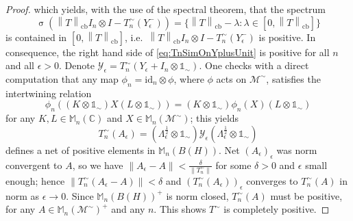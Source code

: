 \documentclass[reqno]{amsart}
\theoremstyle{plain}
\numberwithin{equation}{section}
\numberwithin{theorem}{section}
\numberwithin{lemma}{section}
\numberwithin{definition}{section}
\numberwithin{corollary}{section}
\numberwithin{remark}{section}
\newcommand{\complexes}{\mathbb{C}}
\newcommand{\spec}[1]{\operatorname{\sigma}{\left(#1\right)}}
\newcommand{\id}[1]{\mathrm{id}_{#1}}
\newcommand{\cbnorm}[1]{\left\| #1 \right\|_{\mathrm{cb}}}
\newcommand{\matr}[1]{\mathbb{M}_{#1}(\complexes)}
\newcommand{\matra}[2]{\mathbb{M}_{#1}(#2)}
\newcommand{\unit}{\mathds{1}}
\begin{document}
\begin{proof}
    which yields, with the use of the spectral theorem, that the spectrum
    \begin{equation}
        \spec{\cbnorm{T}I_n \otimes I - T_{n}^{\sim}(Y_{\epsilon}^{-})} = \{\cbnorm{T} - \lambda : \lambda \in [0, \cbnorm{T}] \}
    \end{equation}
    is contained in $[0,\cbnorm{T}]$, i.e.~$\cbnorm{T}I_n \otimes I - T_{n}^{\sim}(Y_{\epsilon}^{-})$ is positive. In consequence, the right hand side of \eqref{eq:TnSimOnYplusUnit} is positive for all $n$ and all $\epsilon > 0$. Denote $\mathcal{Y}_\epsilon = T_{n}^{\sim}(Y_\epsilon + I_n \otimes \unit_\sim)$. One checks with a direct computation that any map $\phi_n = \id{n}\otimes\phi$, where $\phi$ acts on $\mathscr{M}^\sim$, satisfies the intertwining relation
    \begin{equation}
        \phi_n \left((K \otimes \unit_\sim)X(L \otimes \unit_\sim)\right) = (K \otimes \unit_\sim) \phi_n(X) (L \otimes \unit_\sim)
    \end{equation}
    for any $K,L \in \matr{n}$ and $X \in \matra{n}{\mathscr{M}^\sim}$; this yields
    \begin{equation}
        T_{n}^{\sim} (A_\epsilon) = \left(\Lambda_{\epsilon}^{\frac{1}{2}}\otimes\unit_\sim\right) \mathcal{Y}_\epsilon \left(\Lambda_{\epsilon}^{\frac{1}{2}}\otimes\unit_\sim\right)
    \end{equation}
    defines a net of positive elements in $\matra{n}{B(H)}$. Net $\left(A_\epsilon\right)_\epsilon$ was norm convergent to $A$, so we have $\| A_\epsilon - A\| < \frac{\delta}{\|T^{\sim}_{n}\|}$ for some $\delta > 0$ and $\epsilon$ small enough; hence $\| T_{n}^{\sim} (A_\epsilon - A) \| < \delta$ and $\left(T_{n}^{\sim} (A_\epsilon)\right)_\epsilon$ converges to $T_{n}^{\sim}(A)$ in norm as $\epsilon \to 0$. Since $\matra{n}{B(H)}^+$ is norm closed, $T_{n}^{\sim}(A)$ must be positive, for any $A \in \matra{n}{\mathscr{M}^\sim}^+$ and any $n$. This shows $T^\sim$ is completely positive.
\end{proof}



\end{document}
